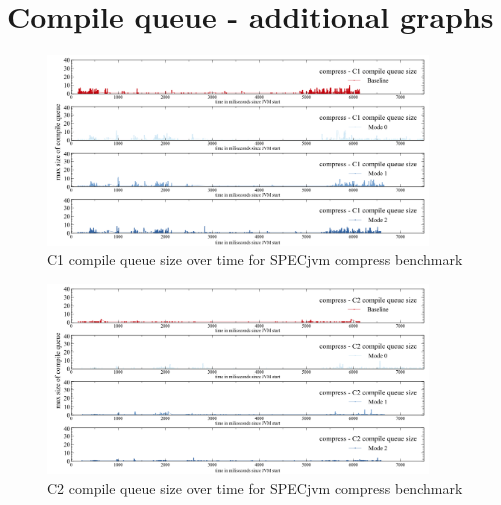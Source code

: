 \section{Compile queue - additional graphs}
\label{a:additional_graphs}
\begin{figure}[ht]
  \begin{center}
    \centering
    \includegraphics[width=0.90\textwidth]{figures/spec_queue_compress_separate_c1.png}
    \caption{C1 compile queue size over time for SPECjvm compress benchmark}
    \label{f:spec_queue_compress_separate_c1}
  \end{center}
\end{figure}
\begin{figure}[ht]
  \begin{center}
    \centering
    \includegraphics[width=0.90\textwidth]{figures/spec_queue_compress_separate_c2.png}
    \caption{C2 compile queue size over time for SPECjvm compress benchmark}
    \label{f:spec_queue_compress_separate_c2}
  \end{center}
\end{figure}
